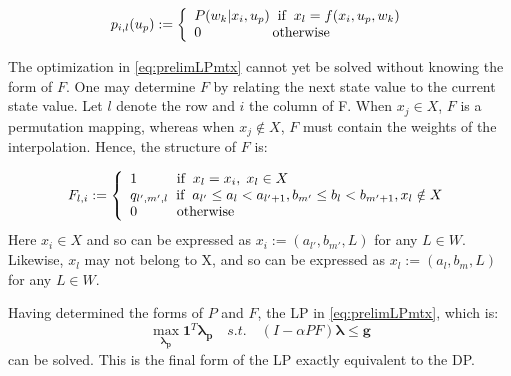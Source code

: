 \documentclass[conference]{IEEEtran}
\begin{document}
\begin{displaymath}
p_{i,l}(u_{p}):=
\left\{
\begin{array}{l}
P(w_{k}|x_{i},u_{p}) \hspace{0.2cm} \text{if} \hspace{0.2cm} x_{l}=f(x_{i},u_{p},w_{k})\\
0 \hspace{1.8cm} \text{otherwise}
\end{array}
\right.
\end{displaymath}

The optimization in \eqref{eq:prelimLPmtx} cannot yet be solved without knowing the form of $F$. One may determine $F$ by relating the next state value to the current state value. Let $l$ denote the row and $i$ the column of F. When $x_{j}\in X$, $F$ is a permutation mapping, whereas when $x_{j}\not\in X$, $F$ must contain the weights of the interpolation. Hence, the structure of $F$ is:

\begin{displaymath}
F_{l,i}:=
\left\{
\begin{array}{l}
1		   \hspace{1cm} \text{if} \hspace{0.2cm}x_{l}=x_{i}, \hspace{0.1cm}x_{l}\in X\\
q_{l',m',l}\hspace{0.2cm} \text{if} \hspace{0.2cm} a_{l'}\leq a_{l}< a_{l'+1}, b_{m'}\leq b_{l}< b_{m'+1}, x_{l}\notin X\\
0		   \hspace{1cm} \text{otherwise}
\end{array}
\right.
\end{displaymath} Here $x_{i}\in X$ and so can be expressed as $x_{i}:=(a_{l'},b_{m'},L)$ for any $L\in W$. Likewise, $x_{l}$ may not belong to X, and so can be expressed as $x_{l}:=(a_{l},b_{m},L)$ for any $L\in W$.

Having determined the forms of $P$ and $F$, the LP in \eqref{eq:prelimLPmtx}, which is:
\begin{equation} \label{eq:LPfinal}
    \max_{\boldsymbol{\lambda_{p}}} \boldsymbol{1}^{T} \boldsymbol{\lambda_{p}}
    \hspace{1em}s.t.\hspace{1em}
    (I-\alpha PF)\boldsymbol{\lambda} \leq \boldsymbol{g}
\end{equation} can be solved. This is the final form of the LP exactly equivalent to the DP. 
\end{document}
